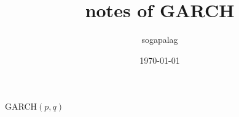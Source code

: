 \documentclass[paper=a4, fontsize=11pt]{scrartcl} %
\title{notes of GARCH}
\author{sogapalag}
\date{\normalsize\today}
\numberwithin{equation}{section} %
\numberwithin{figure}{section} %
\numberwithin{table}{section} %
\begin{document}
\maketitle
GARCH$(p,q)$\\
\end{document}
